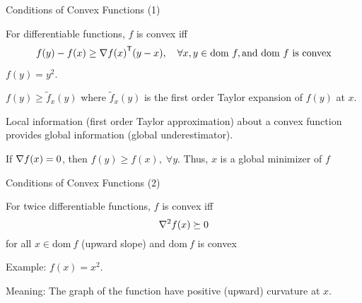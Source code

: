 \documentclass[handout,fleqn,aspectratio=169]{beamer}
\begin{document}
\begin{frame}{Conditions of Convex Functions (1)}

\plitemsep 0.1in

\bci 

\item {} For differentiable functions, $f$ is convex iff
\[
f(y)-f(x)\geq {\nabla f(x)}^{\mathsf{T}}(y-x), \quad \forall x,y\in \text{dom} \ f, \text{and} \ \text{dom} \ f \ \text{is convex}
\]


\item \exam $f(y) = y^2.$

\item $f(y)\geq \tilde{f}_{x}(y)$ where $\tilde{f}_{x}(y)$ is
  the first order Taylor expansion of $f(y)$ at $x$.

\item {\red Local} information (first order Taylor
  approximation) about a convex function provides {\red global}
  information (global underestimator).
\item If $\nabla f(x)=0$, then $f(y)\geq f(x), \; \forall y.$ Thus, $x$ is a global minimizer of $f$

\eci
\end{frame}



\begin{frame}{Conditions of Convex Functions (2)}

\plitemsep 0.1in

\bci 

\item {} For twice differentiable functions, $f$ is convex iff
\[
\nabla ^{2}f(x)\succeq 0
\]
for all $x\in\text{dom} \ f$ (upward slope) and $\text{dom} \ f$ is convex


\item Example: $f(x) = x^2.$

\item Meaning: The graph of the function have positive (upward) curvature at $x.$

\eci

\end{frame}
\end{document}
